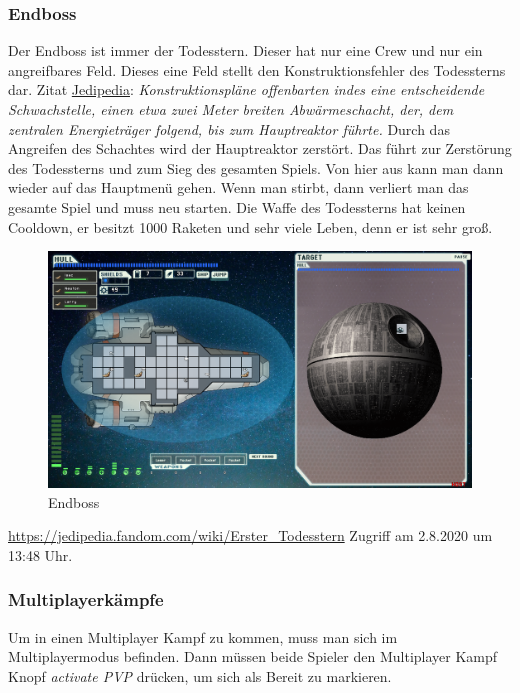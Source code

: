 \documentclass[fontsize=12pt,paper=a4,twoside]{scrartcl}
\begin{document}
\subsubsection{Endboss}

Der Endboss ist immer der Todesstern. Dieser hat nur eine Crew und nur ein angreifbares Feld. Dieses eine Feld stellt den Konstruktionsfehler des Todessterns dar. Zitat \href{https://jedipedia.fandom.com/wiki/Erster_Todesstern}{Jedipedia}: \textit{\glqq Konstruktionspläne offenbarten indes eine entscheidende Schwachstelle, einen etwa zwei Meter breiten Abwärmeschacht, der, dem zentralen Energieträger folgend, bis zum Hauptreaktor führte.\grqq} Durch das Angreifen des Schachtes wird der Hauptreaktor zerstört. Das führt zur Zerstörung des Todessterns und zum Sieg des gesamten Spiels. Von hier aus kann man dann wieder auf das Hauptmenü gehen. Wenn man stirbt, dann verliert man das gesamte Spiel und muss neu starten. Die Waffe des Todessterns hat keinen Cooldown, er besitzt 1000 Raketen und sehr viele Leben, denn er ist sehr groß. 

\begin{figure}[H]
\centering
\includegraphics[width=1\linewidth]{DasSpiel/Kampf/endboss.png}
\caption{Endboss}
\end{figure}


\url{https://jedipedia.fandom.com/wiki/Erster_Todesstern} Zugriff am 2.8.2020 um 13:48 Uhr.

\subsubsection{Multiplayerkämpfe}

Um in einen Multiplayer Kampf zu kommen, muss man sich im Multiplayermodus befinden. Dann müssen beide Spieler den Multiplayer Kampf Knopf \textit{activate PVP} drücken, um sich als Bereit zu markieren. 
\end{document}
